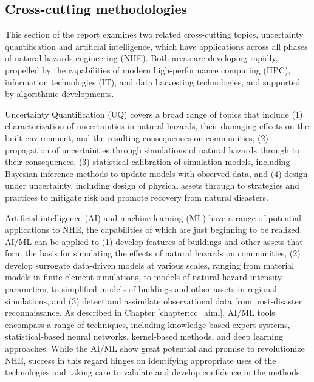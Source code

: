 
\begin{partbacktext}
\part{Cross-cutting methodologies}
\label{part:cross}

This section of the report examines two related cross-cutting topics, uncertainty quantification and artificial intelligence, which have applications across all phases of natural hazards engineering (NHE).  Both areas are developing rapidly, propelled by the capabilities of modern high-performance computing (HPC), information technologies (IT), and data harvesting technologies, and supported by algorithmic developments.  

Uncertainty Quantification (UQ) covers a broad range of topics that include (1) characterization of uncertainties in natural hazards, their damaging effects on the built environment, and the resulting consequences on communities, (2) propagation of uncertainties through simulations of natural hazards through to their consequences, (3) statistical calibration of simulation models, including Bayesian inference methods to update models with observed data, and (4) design under uncertainty, including design of physical assets through to strategies and practices to mitigate risk and promote recovery from natural disasters.  

Artificial intelligence (AI) and machine learning (ML) have a range of potential applications to NHE, the capabilities of which are just beginning to be realized.   AI/ML can be applied to (1) develop features of buildings and other assets that form the basis for simulating the effects of natural hazards on communities, (2) develop surrogate data-driven models at various scales, ranging from material models in finite element simulations, to models of natural hazard intensity parameters, to simplified models of buildings and other assets in regional simulations, and (3) detect and assimilate observational data from post-disaster reconnaissance.  As described in Chapter \ref{chapter:cc_aiml}, AI/ML tools encompass a range of techniques, including knowledge-based expert systems, statistical-based neural networks, kernel-based methods, and deep learning approaches.   While the AI/ML show great potential and promise to revolutionize NHE, success in this regard hinges on identifying appropriate uses of the technologies and taking care to validate and develop confidence in the methods.


\end{partbacktext}